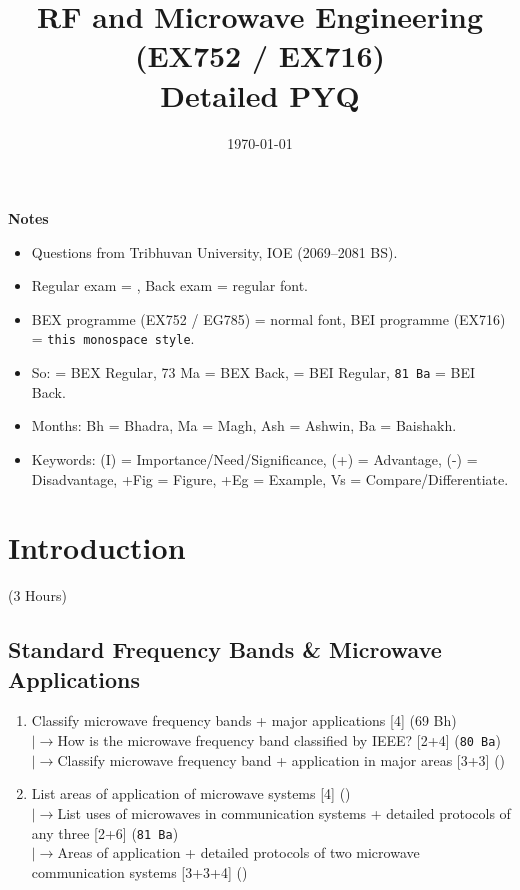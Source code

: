 \documentclass[12pt]{article}
\title{RF and Microwave Engineering (EX752 / EX716)\\[0.4em]\large Detailed PYQ}
\author{}
\date{\today}
\newcommand{\lb}{\\$\left|\rightarrow\right.$}
\begin{document}
\maketitle
\vspace{6cm}
\textbf{Notes}
\begin{itemize}[noitemsep]
  \item Questions from Tribhuvan University, IOE (2069--2081 BS).
  \item Regular exam = , Back exam = regular font.
  \item BEX programme (EX752 / EG785) = normal font, BEI programme (EX716) = \texttt{this monospace style}.
  \item So:  = BEX Regular, 73 Ma = BEX Back,  = BEI Regular, \texttt{81 Ba} = BEI Back.
  \item Months: Bh = Bhadra, Ma = Magh, Ash = Ashwin, Ba = Baishakh.
  \item Keywords: (I) = Importance/Need/Significance, (+) = Advantage, (-) = Disadvantage, +Fig = Figure, +Eg = Example, Vs = Compare/Differentiate.
\end{itemize}
\pagebreak
\tableofcontents
\pagebreak

\section{Introduction}
\begin{center}(3 Hours)\end{center}

  \subsection{Standard Frequency Bands \& Microwave Applications}
    \begin{enumerate}[topsep=0pt, noitemsep]
      \item Classify microwave frequency bands + major applications \hfill [4] (69 Bh)
        \lb How is the microwave frequency band classified by IEEE? \hfill [2+4] (\texttt{80 Ba})
        \lb Classify microwave frequency band + application in major areas \hfill [3+3] ()
      \item List areas of application of microwave systems \hfill [4] ()
        \lb List uses of microwaves in communication systems + detailed protocols of any three \hfill [2+6] (\texttt{81 Ba})
        \lb Areas of application + detailed protocols of two microwave communication systems \hfill [3+3+4] ()
    \end{enumerate}
\end{document}
